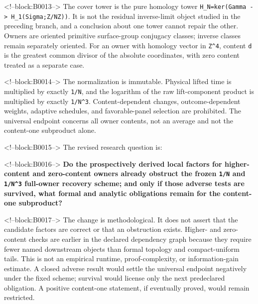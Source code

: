 \documentclass[11pt]{article}
\begin{document}
<!--block:B0013-->
The cover tower is the pure homology tower
\texttt{H\_N=ker(Gamma\ -\textgreater{}\ H\_1(Sigma;Z/NZ))}. It is not
the residual inverse-limit object studied in the preceding branch, and a
conclusion about one tower cannot repair the other. Owners are oriented
primitive surface-group conjugacy classes; inverse classes remain
separately oriented. For an owner with homology vector in
\texttt{Z\^{}4}, content \texttt{d} is the greatest common divisor of
the absolute coordinates, with zero content treated as a separate case.

<!--block:B0014-->
The normalization is immutable. Physical lifted time is multiplied by
exactly \texttt{1/N}, and the logarithm of the raw lift-component
product is multiplied by exactly \texttt{1/N\^{}3}. Content-dependent
changes, outcome-dependent weights, adaptive schedules, and
favorable-panel selection are prohibited. The universal endpoint
concerns all owner contents, not an average and not the content-one
subproduct alone.

<!--block:B0015-->
The revised research question is:

<!--block:B0016-->
\textbf{Do the prospectively derived local factors for higher-content
and zero-content owners already obstruct the frozen \texttt{1/N} and
\texttt{1/N\^{}3} full-owner recovery scheme; and only if those adverse
tests are survived, what formal and analytic obligations remain for the
content-one subproduct?}

<!--block:B0017-->
The change is methodological. It does not assert that the candidate factors
are correct or that an obstruction exists. Higher- and zero-content checks are
earlier in the declared dependency graph because they require fewer named
downstream objects than formal topology and compact-uniform tails. This is not
an empirical runtime, proof-complexity, or information-gain estimate. A closed
adverse result would settle the universal endpoint negatively under the fixed
scheme; survival would license only the next predeclared obligation. A positive
content-one statement, if eventually proved, would remain restricted.
\end{document}
